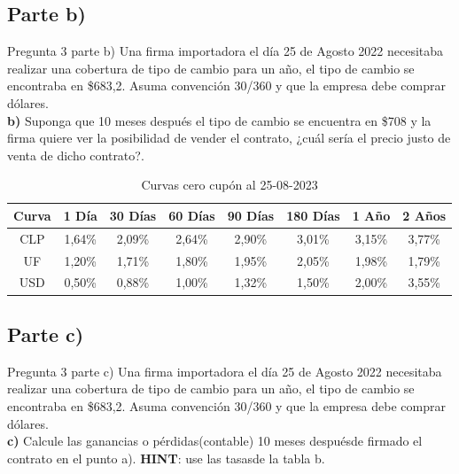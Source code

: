 \documentclass{beamer}
\begin{document}
\subsection{Parte b)}
\begin{frame}{Pregunta 3 parte b)}
  Una firma importadora el día 25 de Agosto 2022 necesitaba realizar una cobertura de tipo de cambio 
para un año, el tipo de cambio se encontraba en \$683,2. Asuma convención 30/360 y que la empresa debe comprar dólares.\\

\textbf{b)} Suponga que 10 meses después el tipo de cambio se encuentra en \$708 y la firma quiere ver
  la posibilidad de vender el contrato, ¿cuál sería el precio justo de venta de dicho contrato?.
  \begin{table}[h!]
      \centering
      \scriptsize
      \caption{Curvas cero cupón al 25-08-2023}
      \begin{tabular}{|c|c|c|c|c|c|c|c|}
      \hline
      \textbf{Curva} & \textbf{1 Día} & \textbf{30 Días} & \textbf{60 Días} & \textbf{90 Días} & \textbf{180 Días} & \textbf{1 Año} & \textbf{2 Años} \\
      \hline
      CLP & 1{,}64\% & 2{,}09\% & 2{,}64\% & 2{,}90\% & 3{,}01\% & 3{,}15\% & 3{,}77\% \\
      UF  & 1{,}20\% & 1{,}71\% & 1{,}80\% & 1{,}95\% & 2{,}05\% & 1{,}98\% & 1{,}79\% \\
      USD & 0{,}50\% & 0{,}88\% & 1{,}00\% & 1{,}32\% & 1{,}50\% & 2{,}00\% & 3{,}55\% \\
      \hline
      \end{tabular}
  \end{table}  
\end{frame}

\subsection{Parte c)}
\begin{frame}{Pregunta 3 parte c)}
  Una firma importadora el día 25 de Agosto 2022 necesitaba realizar una cobertura de tipo de cambio 
  para un año, el tipo de cambio se encontraba en \$683,2. Asuma convención 30/360 y que la empresa debe comprar dólares.\\
  \textbf{c)} Calcule las ganancias o pérdidas(contable) 10 meses despuésde firmado el contrato en el 
  punto a). \textbf{HINT}: use las tasasde la tabla b.  
  
\end{frame}
\end{document}
